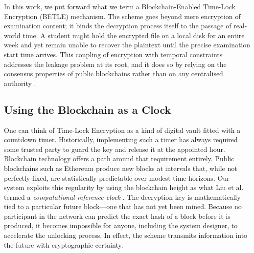 \documentclass[final,5p,times]{elsarticle}
\begin{document}
In this work, we put forward what we term a Blockchain-Enabled Time-Lock Encryption (BETLE) mechanism. The scheme goes beyond mere encryption of examination content; it binds the decryption process itself to the passage of real-world time. A student might hold the encrypted file on a local disk for an entire week and yet remain unable to recover the plaintext until the precise examination start time arrives. This coupling of encryption with temporal constraints addresses the leakage problem at its root, and it does so by relying on the consensus properties of public blockchains rather than on any centralised authority \cite{tschorsch2016bitcoin}.

\subsection{Using the Blockchain as a Clock}
One can think of Time-Lock Encryption as a kind of digital vault fitted with a countdown timer. Historically, implementing such a timer has always required some trusted party to guard the key and release it at the appointed hour. Blockchain technology offers a path around that requirement entirely. Public blockchains such as Ethereum produce new blocks at intervals that, while not perfectly fixed, are statistically predictable over modest time horizons. Our system exploits this regularity by using the blockchain height as what Liu et al. termed a \textit{computational reference clock} \cite{liu2018build}. The decryption key is mathematically tied to a particular future block—one that has not yet been mined. Because no participant in the network can predict the exact hash of a block before it is produced, it becomes impossible for anyone, including the system designer, to accelerate the unlocking process. In effect, the scheme transmits information into the future with cryptographic certainty.
\end{document}
